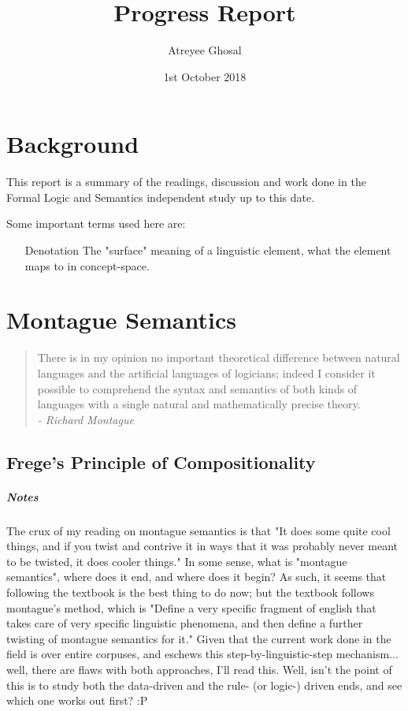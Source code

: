 \documentclass[letterpaper,12pt]{article}
\begin{document}
\title{Progress Report}
\author{Atreyee Ghosal}
\date{1st October 2018}
\maketitle

\section{Background}

This report is a summary of the readings, discussion and work done in the Formal Logic and Semantics independent study up to this date.

Some important terms used here are:

\begin{itemize}
\item[Denotation]
The "surface" meaning of a linguistic element, what the element maps to in concept-space.
\end{itemize}

\section{Montague Semantics}

\begin{quote}
	There is in my opinion no important theoretical difference between natural languages and the artificial languages of logicians; indeed I consider it possible to comprehend the syntax and semantics of both kinds of languages with a single natural and mathematically precise theory. \\
\textit{- Richard Montague}
\end{quote}

\subsection{Frege's Principle of Compositionality}


\subparagraph{Notes}

The crux of my reading on montague semantics is that "It does some quite cool things, and if you twist and contrive it in ways that it was probably never meant to be twisted, it does cooler things." In some sense, what is "montague semantics", where does it end, and where does it begin? \break As such, it seems that following the textbook is the best thing to do now; but the textbook follows montague's method, which is "Define a very specific fragment of english that takes care of very specific linguistic phenomena, and then define a further twisting of montague semantics for it." Given that the current work done in the field is over entire corpuses, and eschews this step-by-linguistic-step mechanism... well, there are flaws with both approaches, I'll read this. \break Well, isn't the point of this is to study both the data-driven and the rule- (or logic-) driven ends, and see which one works out first? :P
\end{document}
